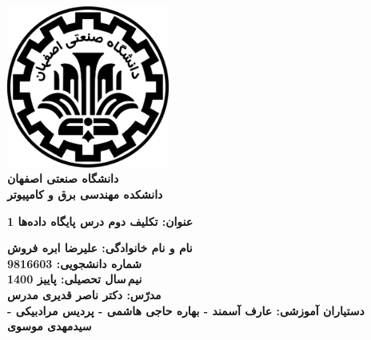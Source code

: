 \begin{titlepage}
\begin{center}
\includegraphics[width=0.4\textwidth]{figures/IUT Logo.png}\\
        
\LARGE
\textbf{دانشگاه صنعتی اصفهان}\\
\textbf{دانشکده مهندسی برق و کامپیوتر}\\
        
\vfill
        
\huge
\textbf{عنوان: تکلیف دوم درس پایگاه داده‌ها 1}\\
        
\vfill
        
\LARGE
\textbf{نام و نام خانوادگی: علیرضا ابره فروش}\\
\textbf{شماره دانشجویی: 9816603}\\
\textbf{نیم\,سال تحصیلی: پاییز 1400}\\
\textbf{مدرّس: دکتر ناصر قدیری مدرس}\\
\textbf{دستیاران آموزشی: عارف آسمند - بهاره حاجی هاشمی - پردیس مرادبیکی - سیدمهدی موسوی}\\
\end{center}
\end{titlepage}
